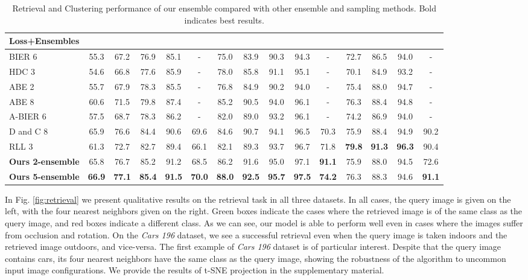 \documentclass[runningheads]{llncs}
\begin{document}
\begin{table}[t]
{\begin{tabular}{@{}l|ccccc|ccccc|cccc@{}}
\textbf{Loss+Ensembles} &  \\ \hline
BIER 6  \cite{DBLP:conf/iccv/OpitzWPB17} & 55.3 & 67.2 & 76.9 & 85.1 &  - & 75.0 & 83.9 & 90.3 & 94.3 &  - &  72.7 & 86.5 & 94.0  & -\\
HDC 3  \cite{DBLP:conf/iccv/YuanYZ17} &  54.6 & 66.8 & 77.6 & 85.9 & - &  78.0 & 85.8 & 91.1 & 95.1 & - & 70.1 & 84.9 & 93.2 & - \\
ABE 2  \cite{DBLP:conf/eccv/KimGCLK18} &  55.7 & 67.9 & 78.3 & 85.5 & - & 76.8 & 84.9 & 90.2 & 94.0 & - & 75.4 & 88.0 & 94.7  & -  \\
ABE 8  \cite{DBLP:conf/eccv/KimGCLK18} &  60.6 & 71.5 & 79.8 & 87.4 & - & 85.2 & 90.5 & 94.0 & 96.1 &  - & 76.3 & 88.4 &  94.8 & - \\
A-BIER 6 \cite{DBLP:journals/corr/abs-1801-04815} & 57.5 & 68.7 & 78.3 & 86.2 & - &  82.0 & 89.0 & 93.2 & 96.1 &  - & 74.2 & 86.9 & 94.0 & - \\
D and C 8  \cite{DDBLP:conf/cvpr/Sanakoyeu2019} & 65.9 & 76.6 & 84.4 & 90.6 & 69.6 & 84.6 & 90.7 & 94.1 & 96.5 &  70.3 &   75.9   & 88.4 & 94.9 &90.2 \\ 
RLL 3  \cite{DBLP:conf/cvpr/WangHKHGR19} & 61.3 & 72.7 & 82.7 & 89.4 & 66.1 & 82.1 & 89.3 & 93.7 & 96.7 & 71.8 &  \textbf{79.8} & \textbf{91.3} & \textbf{96.3} & 90.4\\
\hline
\textbf{Ours 2-ensemble} & 65.8 & 76.7 & 85.2 & 91.2 & 68.5 &  86.2 & 91.6 & 95.0 & 97.1 & \textbf{91.1} & 75.9 & 88.0 & 94.5 & 72.6\\
\textbf{Ours 5-ensemble} &  \textbf{66.9} & \textbf{77.1} & \textbf{85.4} & \textbf{91.5} & \textbf{70.0} &  \textbf{88.0} & \textbf{92.5} & \textbf{95.7} & \textbf{97.5} & \textbf{74.2} &  76.3 & 88.3 & 94.6 & \textbf{91.1} \\ \bottomrule
\end{tabular}}
\caption{Retrieval and Clustering performance of our ensemble compared with other ensemble and sampling methods. Bold indicates best results. }
\label{tab:loss_ensembles}
\end{table} 

In Fig. \ref{fig:retrieval} we present qualitative results on the retrieval task in all three datasets. In all cases, the query image is given on the left, with the four nearest neighbors given on the right. 
Green boxes indicate the cases where the retrieved image is of the same class as the query image, and red boxes indicate a different class. 
As we can see, our model is able to perform well even in cases where the images suffer from occlusion and rotation. On the \textit{Cars 196} dataset, we see a successful retrieval even when the query image is taken indoors and the retrieved image outdoors, and vice-versa. The first example of \textit{Cars 196} dataset is of particular interest. Despite that the query image contains  cars, its four nearest neighbors have the same class as the query image, showing the robustness of the algorithm to uncommon input image configurations. We provide the results of t-SNE \cite{DBLP:journals/ml/MaatenH12} projection in the supplementary material.
\end{document}
